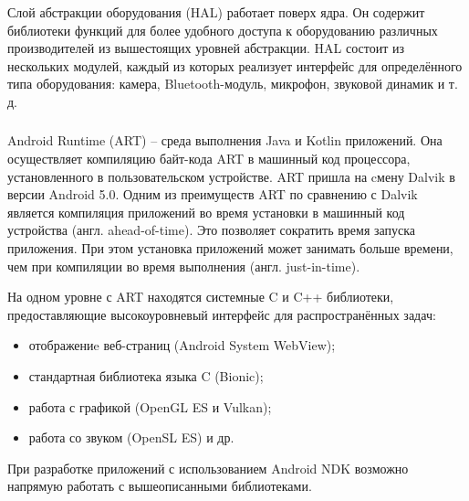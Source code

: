 \subsubsection{}
\label{subsub:android_platform:struct_and_arch:hal}
Слой абстракции оборудования (HAL) работает поверх ядра.
Он содержит библиотеки функций для более удобного доступа к оборудованию различных производителей из вышестоящих уровней абстракции.
HAL состоит из нескольких модулей, каждый из которых реализует интерфейс для определённого типа оборудования: камера, Bluetooth-модуль, микрофон, звуковой динамик и т. д. 

\subsubsection{}
\label{subsub:android_platform:struct_and_arch:art}
Android Runtime (ART) -- среда выполнения Java и Kotlin приложений.
Она осуществляет компиляцию байт-кода ART в машинный код процессора, установленного в пользовательском устройстве.
ART пришла на cмену Dalvik в версии Android 5.0.
Одним из преимуществ ART по сравнению с Dalvik является компиляция приложений во время установки в машинный код устройства (англ. ahead-of-time).
Это позволяет сократить время запуска приложения.
При этом установка приложений может занимать больше времени, чем при компиляции во время выполнения (англ. just-in-time).

На одном уровне с ART находятся системные C и C++ библиотеки, предоставляющие высокоуровневый интерфейс для распространённых задач:
\begin{itemize}
	\item отображениe веб-страниц (Android System WebView);
	\item стандартная библиотека языка C (Bionic);
	\item работа с графикой (OpenGL ES и Vulkan);
	\item работа со звуком (OpenSL ES) и др.
\end{itemize}

При разработке приложений с использованием Android NDK возможно напрямую работать с вышеописанными библиотеками.

